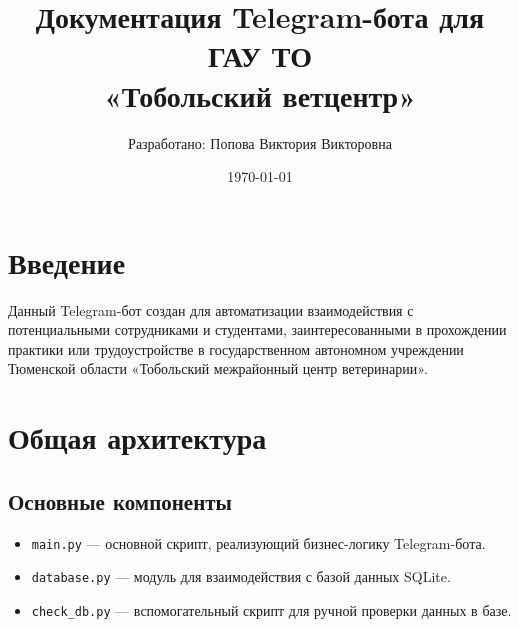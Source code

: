 \documentclass[a4paper,12pt]{article} %
\title{Документация Telegram-бота для ГАУ ТО \\ «Тобольский ветцентр»} %
\author{Разработано: Попова Виктория Викторовна} %
\date{\today }%
\begin{document}
\maketitle
\tableofcontents
\newpage

\section{Введение} %

Данный Telegram-бот создан для автоматизации взаимодействия с потенциальными сотрудниками и студентами, заинтересованными в прохождении практики или трудоустройстве в государственном автономном учреждении Тюменской области «Тобольский межрайонный центр ветеринарии».

\section{Общая архитектура} %
\subsection{Основные компоненты}
\begin{itemize}
    \item \texttt{main.py} — основной скрипт, реализующий бизнес-логику Telegram-бота.  %
    \item \texttt{database.py} — модуль для взаимодействия с базой данных SQLite. %
    \item \texttt{check\_db.py} — вспомогательный скрипт для ручной проверки данных в базе. %
\end{itemize}
\end{document}
